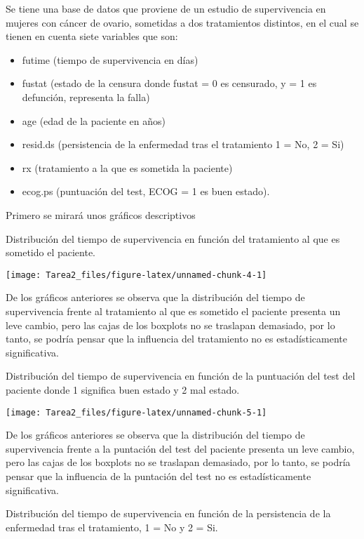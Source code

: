 \documentclass[
]{article}
\begin{document}
Se tiene una base de datos que proviene de un estudio de supervivencia
en mujeres con cáncer de ovario, sometidas a dos tratamientos distintos,
en el cual se tienen en cuenta siete variables que son:

\begin{itemize}
\item
  futime (tiempo de supervivencia en días)
\item
  fustat (estado de la censura donde fustat = 0 es censurado, y = 1 es
  defunción, representa la falla)
\item
  age (edad de la paciente en años)
\item
  resid.ds (persistencia de la enfermedad tras el tratamiento 1 = No, 2
  = Si)
\item
  rx (tratamiento a la que es sometida la paciente)
\item
  ecog.ps (puntuación del test, ECOG = 1 es buen estado).
\end{itemize}

Primero se mirará unos gráficos descriptivos

Distribución del tiempo de supervivencia en función del tratamiento al
que es sometido el paciente.

\begin{center}\texttt{[image: Tarea2\_files/figure-latex/unnamed-chunk-4-1]} \end{center}

De los gráficos anteriores se observa que la distribución del tiempo de
supervivencia frente al tratamiento al que es sometido el paciente
presenta un leve cambio, pero las cajas de los boxplots no se traslapan
demasiado, por lo tanto, se podría pensar que la influencia del
tratamiento no es estadísticamente significativa.

Distribución del tiempo de supervivencia en función de la puntuación del
test del paciente donde 1 significa buen estado y 2 mal estado.

\begin{center}\texttt{[image: Tarea2\_files/figure-latex/unnamed-chunk-5-1]} \end{center}

De los gráficos anteriores se observa que la distribución del tiempo de
supervivencia frente a la puntación del test del paciente presenta un
leve cambio, pero las cajas de los boxplots no se traslapan demasiado,
por lo tanto, se podría pensar que la influencia de la puntación del
test no es estadísticamente significativa.

Distribución del tiempo de supervivencia en función de la persistencia
de la enfermedad tras el tratamiento, 1 = No y 2 = Si.
\end{document}
